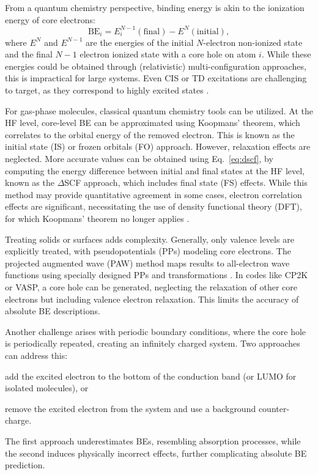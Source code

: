 \documentclass[12pt,a4paper]{article}
\begin{document}
From a quantum chemistry perspective, binding energy is akin to the ionization energy of core electrons:
\begin{equation}
	\text{BE}_i = E^{N-1}_i(\text{final}) - E^{N}(\text{initial}), \label{eq:dscf}
\end{equation}
where $E^{N}$ and $E^{N-1}$ are the energies of the initial $N$-electron non-ionized state and the final $N-1$ electron ionized state with a core hole on atom $i$. While these energies could be obtained through (relativistic) multi-configuration approaches, this is impractical for large systems. Even CIS or TD excitations are challenging to target, as they correspond to highly excited states \cite{vinesPredictionCoreLevel2018}.

For gas-phase molecules, classical quantum chemistry tools can be utilized. At the HF level, core-level BE can be approximated using Koopmans' theorem, which correlates to the orbital energy of the removed electron. This is known as the initial state (IS) or frozen orbitals (FO) approach. However, relaxation effects are neglected. More accurate values can be obtained using Eq.~\eqref{eq:dscf}, by computing the energy difference between initial and final states at the HF level, known as the $\Delta$SCF approach, which includes final state (FS) effects. While this method may provide quantitative agreement in some cases, electron correlation effects are significant, necessitating the use of density functional theory (DFT), for which Koopmans' theorem no longer applies \cite{pueyobellafontPredictingCoreLevel2017}.

Treating solids or surfaces adds complexity. Generally, only valence levels are explicitly treated, with pseudopotentials (PPs) modeling core electrons. The projected augmented wave (PAW) method maps results to all-electron wave functions using specially designed PPs and transformations \cite{blochlProjectorAugmentedwaveMethod1994}. In codes like CP2K or VASP, a core hole can be generated, neglecting the relaxation of other core electrons but including valence electron relaxation. This limits the accuracy of absolute BE descriptions.

Another challenge arises with periodic boundary conditions, where the core hole is periodically repeated, creating an infinitely charged system. Two approaches can address this: 
\begin{inparaenum}[a)]
	\item add the excited electron to the bottom of the conduction band (or LUMO for isolated molecules), or 
	\item remove the excited electron from the system and use a background counter-charge.
\end{inparaenum}
The first approach underestimates BEs, resembling absorption processes, while the second induces physically incorrect effects, further complicating absolute BE prediction.
\end{document}
